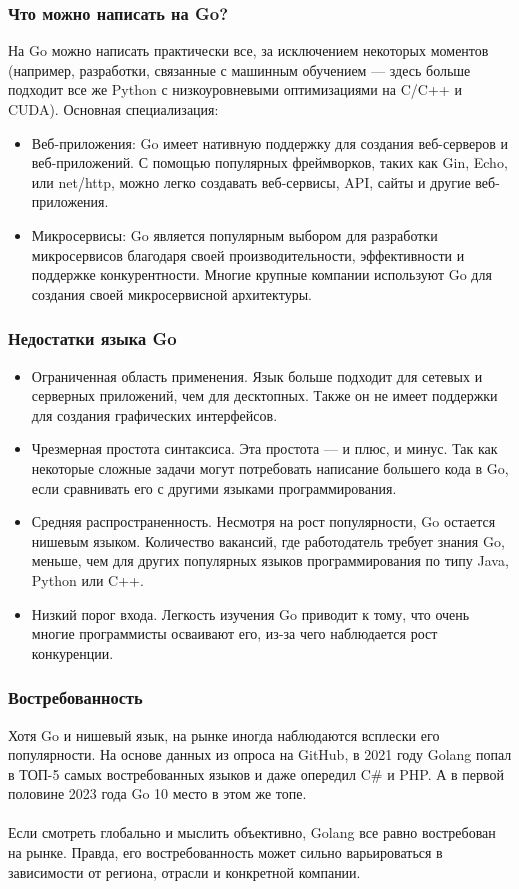 \documentclass{beamer}
\begin{document}
\begin{frame}[fragile] \frametitle{Что можно написать на Go?}
  На Go можно написать практически все, за исключением некоторых моментов
  (например, разработки, связанные с машинным обучением — здесь больше подходит
  все же Python с низкоуровневыми оптимизациями на C/C++ и CUDA).
  Основная специализация:
  \begin{itemize}
    \item Веб-приложения: Go имеет нативную поддержку для создания веб-серверов
    и веб-приложений. С помощью популярных фреймворков, таких как Gin, Echo, или
    net/http, можно легко создавать веб-сервисы, API, сайты и другие
    веб-приложения.
    \item Микросервисы: Go является популярным выбором для разработки
    микросервисов благодаря своей производительности, эффективности и поддержке
    конкурентности. Многие крупные компании используют Go для создания своей
    микросервисной архитектуры.
  \end{itemize}
\end{frame}
\begin{frame}[fragile] \frametitle{Недостатки языка Go}
  \begin{itemize}
  \item Ограниченная область применения. Язык больше подходит для сетевых и
  серверных приложений, чем для десктопных. Также он не имеет поддержки для
  создания графических интерфейсов.
  \item Чрезмерная простота синтаксиса. Эта простота — и плюс, и минус. Так как
  некоторые сложные задачи могут потребовать написание большего кода в Go, если
  сравнивать его с другими языками программирования.
  \item Средняя распространенность. Несмотря на рост популярности, Go остается
  нишевым языком. Количество вакансий, где работодатель требует знания Go,
  меньше, чем для других популярных языков программирования по типу Java, Python
  или C++.
  \item Низкий порог входа. Легкость изучения Go приводит к тому, что очень
  многие программисты осваивают его, из-за чего наблюдается рост конкуренции.
  \end{itemize}
\end{frame}
\begin{frame}[fragile] \frametitle{Востребованность}
  Хотя Go и нишевый язык, на рынке иногда наблюдаются всплески его
  популярности. На основе данных из опроса на GitHub, в 2021 году Golang попал в
  ТОП-5 самых востребованных языков и даже опередил C\# и PHP. А в первой
  половине 2023 года Go 10 место в этом же топе.
  \\\\
  Если смотреть глобально и мыслить объективно, Golang все равно востребован на
  рынке. Правда, его востребованность может сильно варьироваться в зависимости
  от региона, отрасли и конкретной компании.
\end{frame}
\end{document}
